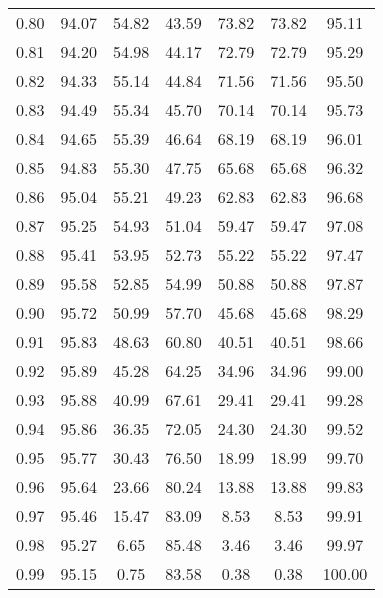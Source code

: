 \begin{tabular}{|c|c|c|c|c|c|c|}
      0.80 &     94.07 &     54.82 &      43.59 &   73.82 &      73.82 &         95.11 \\
      0.81 &     94.20 &     54.98 &      44.17 &   72.79 &      72.79 &         95.29 \\
      0.82 &     94.33 &     55.14 &      44.84 &   71.56 &      71.56 &         95.50 \\
      0.83 &     94.49 &     55.34 &      45.70 &   70.14 &      70.14 &         95.73 \\
      0.84 &     94.65 &     55.39 &      46.64 &   68.19 &      68.19 &         96.01 \\
      0.85 &     94.83 &     55.30 &      47.75 &   65.68 &      65.68 &         96.32 \\
      0.86 &     95.04 &     55.21 &      49.23 &   62.83 &      62.83 &         96.68 \\
      0.87 &     95.25 &     54.93 &      51.04 &   59.47 &      59.47 &         97.08 \\
      0.88 &     95.41 &     53.95 &      52.73 &   55.22 &      55.22 &         97.47 \\
      0.89 &     95.58 &     52.85 &      54.99 &   50.88 &      50.88 &         97.87 \\
      0.90 &     95.72 &     50.99 &      57.70 &   45.68 &      45.68 &         98.29 \\
      0.91 &     95.83 &     48.63 &      60.80 &   40.51 &      40.51 &         98.66 \\
      0.92 &     95.89 &     45.28 &      64.25 &   34.96 &      34.96 &         99.00 \\
      0.93 &     95.88 &     40.99 &      67.61 &   29.41 &      29.41 &         99.28 \\
      0.94 &     95.86 &     36.35 &      72.05 &   24.30 &      24.30 &         99.52 \\
      0.95 &     95.77 &     30.43 &      76.50 &   18.99 &      18.99 &         99.70 \\
      0.96 &     95.64 &     23.66 &      80.24 &   13.88 &      13.88 &         99.83 \\
      0.97 &     95.46 &     15.47 &      83.09 &    8.53 &       8.53 &         99.91 \\
      0.98 &     95.27 &      6.65 &      85.48 &    3.46 &       3.46 &         99.97 \\
      0.99 &     95.15 &      0.75 &      83.58 &    0.38 &       0.38 &        100.00 \\
\bottomrule
\end{tabular}
